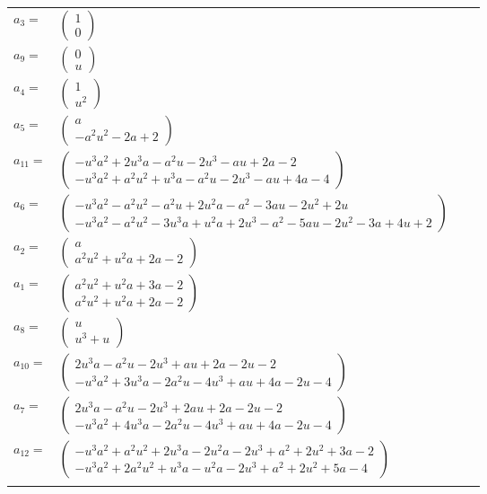 \documentclass[1p]{elsarticle_modified}
\theoremstyle{definition}
\begin{document}
\begin{tabular}{m{7pt} m{180pt} m{7pt} m{180pt} }
\flushright $a_{3}=$&$\begin{pmatrix}1\\0\end{pmatrix}$ \\
\flushright $a_{9}=$&$\begin{pmatrix}0\\u\end{pmatrix}$ \\
\flushright $a_{4}=$&$\begin{pmatrix}1\\u^2\end{pmatrix}$ \\
\flushright $a_{5}=$&$\begin{pmatrix}a\\- a^2 u^2-2 a+2\end{pmatrix}$ \\
\flushright $a_{11}=$&$\begin{pmatrix}- u^3 a^2+2 u^3 a- a^2 u-2 u^3- a u+2 a-2\\- u^3 a^2+a^2 u^2+u^3 a- a^2 u-2 u^3- a u+4 a-4\end{pmatrix}$ \\
\flushright $a_{6}=$&$\begin{pmatrix}- u^3 a^2- a^2 u^2- a^2 u+2 u^2 a- a^2-3 a u-2 u^2+2 u\\- u^3 a^2- a^2 u^2-3 u^3 a+u^2 a+2 u^3- a^2-5 a u-2 u^2-3 a+4 u+2\end{pmatrix}$ \\
\flushright $a_{2}=$&$\begin{pmatrix}a\\a^2 u^2+u^2 a+2 a-2\end{pmatrix}$ \\
\flushright $a_{1}=$&$\begin{pmatrix}a^2 u^2+u^2 a+3 a-2\\a^2 u^2+u^2 a+2 a-2\end{pmatrix}$ \\
\flushright $a_{8}=$&$\begin{pmatrix}u\\u^3+u\end{pmatrix}$ \\
\flushright $a_{10}=$&$\begin{pmatrix}2 u^3 a- a^2 u-2 u^3+a u+2 a-2 u-2\\- u^3 a^2+3 u^3 a-2 a^2 u-4 u^3+a u+4 a-2 u-4\end{pmatrix}$ \\
\flushright $a_{7}=$&$\begin{pmatrix}2 u^3 a- a^2 u-2 u^3+2 a u+2 a-2 u-2\\- u^3 a^2+4 u^3 a-2 a^2 u-4 u^3+a u+4 a-2 u-4\end{pmatrix}$ \\
\flushright $a_{12}=$&$\begin{pmatrix}- u^3 a^2+a^2 u^2+2 u^3 a-2 u^2 a-2 u^3+a^2+2 u^2+3 a-2\\- u^3 a^2+2 a^2 u^2+u^3 a- u^2 a-2 u^3+a^2+2 u^2+5 a-4\end{pmatrix}$\\&\end{tabular}
\end{document}
